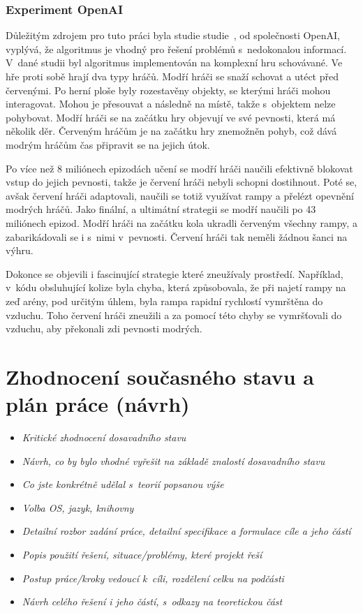 \subsection{Experiment OpenAI}\label{subsec:experiment-openai}
Důležitým zdrojem pro tuto práci byla studie studie~\cite{PPO_Hide_Seek_paper}, od společnosti OpenAI, vyplývá, že algoritmus je vhodný pro řešení problémů s~nedokonalou informací.
V~dané studii byl algoritmus implementován na komplexní hru schovávané.
Ve hře proti sobě hrají dva typy hráčů.
Modří hráči se snaží schovat a utéct před červenými.
Po herní ploše byly rozestavěny objekty, se kterými hráči mohou interagovat.
Mohou je přesouvat a následně  na místě, takže s~objektem nelze pohybovat.
Modří hráči se na začátku hry objevují ve své pevnosti, která má několik děr.
Červeným hráčům je na začátku hry znemožněn pohyb, což dává modrým hráčům čas připravit se na jejich útok.

Po více než 8 miliónech epizodách učení se modří hráči naučili efektivně blokovat vstup do jejich pevnosti, takže je červení hráči nebyli schopni dostihnout.
Poté se, avšak červení hráči adaptovali, naučili se totiž využívat rampy a přelézt opevnění modrých hráčů.
Jako finální, a ultimátní strategii se modří naučili po 43 miliónech epizod.
Modří hráči na začátku kola ukradli červeným všechny rampy, a zabarikádovali se i s~nimi v~pevnosti.
Červení hráči tak neměli žádnou šanci na výhru.

Dokonce se objevili i fascinující strategie které zneužívaly prostředí.
Například, v~kódu obsluhující kolize byla chyba, která způsobovala, že při najetí rampy na zeď arény, pod určitým úhlem, byla rampa rapidní rychlostí vymrštěna do vzduchu.
Toho červení hráči zneužili a za pomocí této chyby se vymršťovali do vzduchu, aby překonali zdi pevnosti modrých.

\chapter{Zhodnocení současného stavu a plán práce (návrh)}
\label{ch:navrh}
\begin{itemize}
  \item \emph {Kritické zhodnocení dosavadního stavu}
  \item \emph {Návrh, co by bylo vhodné vyřešit na základě znalostí dosavadního stavu}
  \item \emph {Co jste konkrétně udělal s~teorií popsanou výše}
  \item \emph {Volba OS, jazyk, knihovny}
  \item \emph {Detailní rozbor zadání práce, detailní specifikace a formulace cíle a jeho částí}
  \item \emph {Popis použití řešení, situace/problémy, které projekt řeší}
  \item \emph {Postup práce/kroky vedoucí k~cíli, rozdělení celku na podčásti}
  \item \emph {Návrh celého řešení i jeho částí, s~odkazy na teoretickou část}
\end{itemize}

